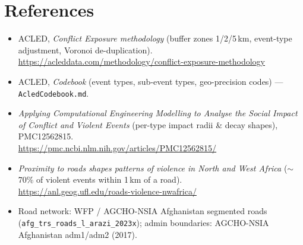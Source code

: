 \documentclass[11pt,a4paper]{article}
\newcommand{\code}[1]{\texttt{\small #1}}
\begin{document}
\section{References}

\begin{itemize}[nosep,leftmargin=1.4em]
  \item ACLED, \emph{Conflict Exposure methodology} (buffer zones 1/2/5\,km, event-type
        adjustment, Voronoi de-duplication).\\
        \url{https://acleddata.com/methodology/conflict-exposure-methodology}
  \item ACLED, \emph{Codebook} (event types, sub-event types, geo-precision codes) ---
        \code{AcledCodebook.md}.
  \item \emph{Applying Computational Engineering Modelling to Analyse the Social Impact of
        Conflict and Violent Events} (per-type impact radii \& decay shapes), PMC12562815.\\
        \url{https://pmc.ncbi.nlm.nih.gov/articles/PMC12562815/}
  \item \emph{Proximity to roads shapes patterns of violence in North and West Africa}
        ($\sim$70\% of violent events within 1\,km of a road).\\
        \url{https://anl.geog.ufl.edu/roads-violence-nwafrica/}
  \item Road network: WFP / AGCHO-NSIA Afghanistan segmented roads
        (\code{afg\_trs\_roads\_l\_arazi\_2023x}); admin boundaries: AGCHO-NSIA Afghanistan
        adm1/adm2 (2017).
\end{itemize}
\end{document}
